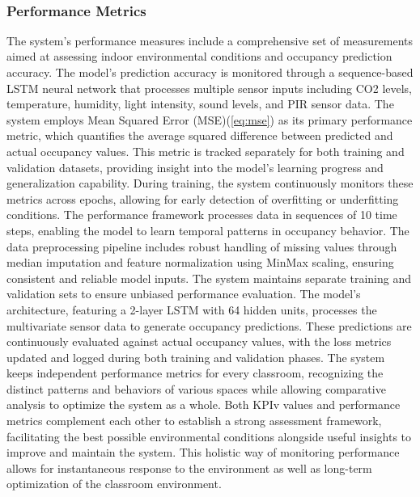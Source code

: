 \\
\subsubsection{Performance Metrics}
The system's performance measures include a comprehensive set of measurements aimed at assessing indoor environmental conditions and occupancy prediction accuracy. The model's prediction accuracy is monitored through a sequence-based LSTM neural network that processes multiple sensor inputs including CO2 levels, temperature, humidity, light intensity, sound levels, and PIR sensor data. The system employs Mean Squared Error (MSE)(\ref{eq:mse}) as its primary performance metric, which quantifies the average squared difference between predicted and actual occupancy values. This metric is tracked separately for both training and validation datasets, providing insight into the model's learning progress and generalization capability. During training, the system continuously monitors these metrics across epochs, allowing for early detection of overfitting or underfitting conditions. The performance framework processes data in sequences of 10 time steps, enabling the model to learn temporal patterns in occupancy behavior. The data preprocessing pipeline includes robust handling of missing values through median imputation and feature normalization using MinMax scaling, ensuring consistent and reliable model inputs. The system maintains separate training and validation sets  to ensure unbiased performance evaluation. The model's architecture, featuring a 2-layer LSTM with 64 hidden units, processes the multivariate sensor data to generate occupancy predictions. These predictions are continuously evaluated against actual occupancy values, with the loss metrics updated and logged during both training and validation phases. The system keeps independent performance metrics for every classroom, recognizing the distinct patterns and behaviors of various spaces while allowing comparative analysis to optimize the system as a whole. Both KPIv values and performance metrics complement each other to establish a strong assessment framework, facilitating the best possible environmental conditions alongside useful insights to improve and maintain the
system. This holistic way of monitoring performance allows for instantaneous response to the environment as well as long-term optimization of the classroom
environment.

